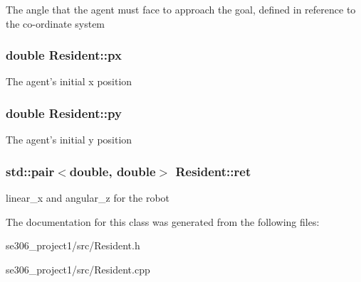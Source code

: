 The angle that the agent must face to approach the goal, defined in reference to the co-\/ordinate system \hypertarget{classResident_aa147b3e473b2ea32b732eb5146ec7e34}{
\subsubsection[{px}]{\setlength{\rightskip}{0pt plus 5cm}double Resident\-::px\hspace{0.3cm}{\ttfamily [protected]}}}\label{classResident_aa147b3e473b2ea32b732eb5146ec7e34}
The agent's initial x position \hypertarget{classResident_ac757cac74a1712dd5746d1c3f5702a21}{
\subsubsection[{py}]{\setlength{\rightskip}{0pt plus 5cm}double Resident\-::py\hspace{0.3cm}{\ttfamily [protected]}}}\label{classResident_ac757cac74a1712dd5746d1c3f5702a21}
The agent's initial y position \hypertarget{classResident_a790131eeebec8aed96b90bd1d9ce7fef}{
\subsubsection[{ret}]{\setlength{\rightskip}{0pt plus 5cm}std\-::pair$<$double, double$>$ Resident\-::ret\hspace{0.3cm}{\ttfamily [protected]}}}\label{classResident_a790131eeebec8aed96b90bd1d9ce7fef}
linear\-\_\-x and angular\-\_\-z for the robot 

The documentation for this class was generated from the following files\-:\begin{DoxyCompactItemize}
\item 
se306\-\_\-project1/src/Resident.\-h\item 
se306\-\_\-project1/src/Resident.\-cpp\end{DoxyCompactItemize}
